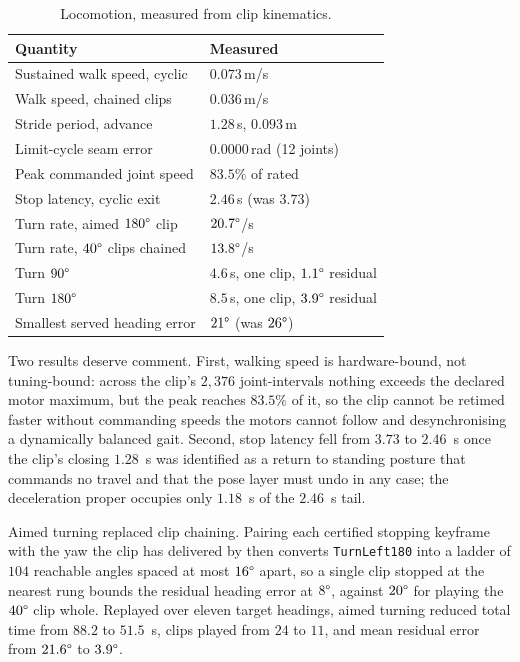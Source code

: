 \documentclass[twocolumn]{article}
\begin{document}
\begin{table}[H]
\centering
\caption{Locomotion, measured from clip kinematics.}
\label{tab:locomotion}
\small
\begin{tabular}{@{}p{3.9cm}p{3.2cm}@{}}
\toprule
Quantity & Measured \\
\midrule
Sustained walk speed, cyclic & $0.073$\,m/s \\
Walk speed, chained clips & $0.036$\,m/s \\
Stride period, advance & $1.28$\,s, $0.093$\,m \\
Limit-cycle seam error & $0.0000$\,rad (12 joints) \\
Peak commanded joint speed & $83.5\%$ of rated \\
Stop latency, cyclic exit & $2.46$\,s (was $3.73$) \\
Turn rate, aimed $180\degree$ clip & $20.7\degree$/s \\
Turn rate, $40\degree$ clips chained & $13.8\degree$/s \\
Turn $90\degree$ & $4.6$\,s, one clip, $1.1\degree$ residual \\
Turn $180\degree$ & $8.5$\,s, one clip, $3.9\degree$ residual \\
Smallest served heading error & $21\degree$ (was $26\degree$) \\
\bottomrule
\end{tabular}
\end{table}

Two results deserve comment. First, walking speed is hardware-bound, not tuning-bound: across
the clip's $2{,}376$ joint-intervals nothing exceeds the declared motor maximum, but the peak
reaches $83.5\%$ of it, so the clip cannot be retimed faster without commanding speeds the
motors cannot follow and desynchronising a dynamically balanced gait. Second, stop latency
fell from $3.73$ to $2.46$~s once the clip's closing $1.28$~s was identified as a return to
standing posture that commands no travel and that the pose layer must undo in any case; the
deceleration proper occupies only $1.18$~s of the $2.46$~s tail.

Aimed turning replaced clip chaining. Pairing each certified stopping keyframe with the yaw
the clip has delivered by then converts \texttt{TurnLeft180} into a ladder of $104$ reachable
angles spaced at most $16\degree$ apart, so a single clip stopped at the nearest rung bounds
the residual heading error at $8\degree$, against $20\degree$ for playing the $40\degree$ clip
whole. Replayed over eleven target headings, aimed turning reduced total time from $88.2$ to
$51.5$~s, clips played from $24$ to $11$, and mean residual error from $21.6\degree$ to
$3.9\degree$.
\end{document}
